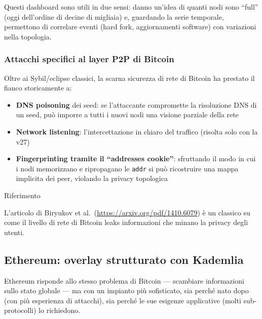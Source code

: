 \documentclass[
  italian,
  openany]{book}
\providecommand{\tightlist}{%
  \setlength{\itemsep}{0pt}\setlength{\parskip}{0pt}}
\begin{document}
Questi dashboard sono utili in due sensi: danno un'idea di quanti nodi
sono ``full'' (oggi dell'ordine di decine di migliaia) e, guardando la
serie temporale, permettono di correlare eventi (hard fork,
aggiornamenti software) con variazioni nella topologia.

\subsubsection{Attacchi specifici al layer P2P di
Bitcoin}\label{attacchi-specifici-al-layer-p2p-di-bitcoin}

Oltre ai Sybil/eclipse classici, la scarna sicurezza di rete di Bitcoin
ha prestato il fianco storicamente a:

\begin{itemize}
\tightlist
\item
  \textbf{DNS poisoning} dei seed: se l'attaccante compromette la
  risoluzione DNS di un seed, può imporre a tutti i nuovi nodi una
  visione parziale della rete
\item
  \textbf{Network listening}: l'intercettazione in chiaro del traffico
  (risolta solo con la v27)
\item
  \textbf{Fingerprinting tramite il ``addresses cookie''}: sfruttando il
  modo in cui i nodi memorizzano e ripropagano le \texttt{addr} si può
  ricostruire una mappa implicita dei peer, violando la privacy
  topologica
\end{itemize}

\begin{calloutnote}{Riferimento}

L'articolo di Biryukov et al.~(\url{https://arxiv.org/pdf/1410.6079}) è
un classico su come il livello di rete di Bitcoin leaks informazioni che
minano la privacy degli utenti.

\end{calloutnote}

\subsection{Ethereum: overlay strutturato con
Kademlia}\label{ethereum-overlay-strutturato-con-kademlia}

Ethereum risponde allo stesso problema di Bitcoin --- scambiare
informazioni sullo stato globale --- ma con un impianto più sofisticato,
sia perché nato dopo (con più esperienza di attacchi), sia perché le sue
esigenze applicative (molti sub-protocolli) lo richiedono.
\end{document}
